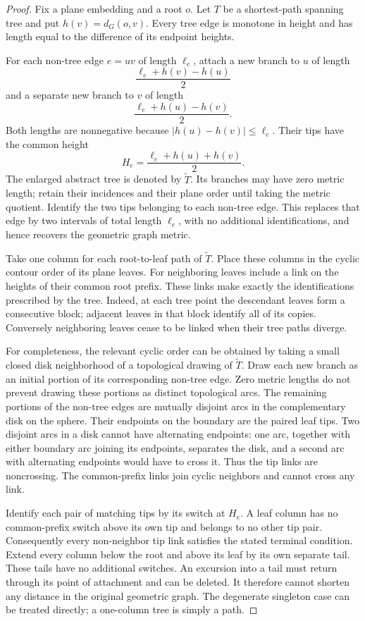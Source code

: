 \begin{proof}
Fix a plane embedding and a root $o$.  Let $T$ be a shortest-path spanning
tree and put $h(v)=d_G(o,v)$.  Every tree edge is monotone in height and has length
equal to the difference of its endpoint heights.

For each non-tree edge $e=uv$ of length $\ell_e$, attach a new branch to
$u$ of length
\[
 \frac{\ell_e+h(v)-h(u)}2
\]
and a separate new branch to $v$ of length
\[
 \frac{\ell_e+h(u)-h(v)}2.
\]
Both lengths are nonnegative because $|h(u)-h(v)|\le\ell_e$.  Their tips
have the common height
\[
 H_e=\frac{\ell_e+h(u)+h(v)}2.
\]
The enlarged abstract tree is denoted by $\widetilde T$.  Its branches may
have zero metric length; retain their incidences and their plane order
until taking the metric quotient.  Identify the two tips belonging to each
non-tree edge.  This replaces that edge by two intervals of total length
$\ell_e$, with no additional identifications, and hence recovers the
geometric graph metric.

Take one column for each root-to-leaf path of $\widetilde T$.  Place these
columns in the cyclic contour order of its plane leaves.  For neighboring
leaves include a link on the heights of their common root prefix.  These
links make exactly the identifications prescribed by the tree.  Indeed,
at each tree point the descendant leaves form a consecutive block; adjacent
leaves in that block identify all of its copies.  Conversely neighboring
leaves cease to be linked when their tree paths diverge.

For completeness, the relevant cyclic order can be obtained by taking a
small closed disk neighborhood of a topological drawing of
$\widetilde T$.  Draw each new branch as an initial portion of its
corresponding non-tree edge.  Zero metric lengths do not prevent drawing
these portions as distinct topological arcs.  The remaining portions of
the non-tree edges are mutually disjoint arcs in the complementary disk
on the sphere.  Their endpoints on the boundary are the paired leaf tips.
Two disjoint arcs in a disk cannot have alternating endpoints: one arc,
together with either boundary arc joining its endpoints, separates the
disk, and a second arc with alternating endpoints would have to cross it.
Thus the tip links are noncrossing.  The common-prefix links join cyclic
neighbors and cannot cross any link.

Identify each pair of matching tips by its switch at $H_e$.  A leaf column
has no common-prefix switch above its own tip and belongs to no other tip
pair.  Consequently every non-neighbor tip link satisfies the stated
terminal condition.  Extend every column below the root and above its
leaf by its own separate tail.  These tails have no additional switches.
An excursion into a tail must return through its point of attachment and
can be deleted.  It therefore cannot shorten any distance in the original
geometric graph.  The degenerate singleton case can be treated directly;
a one-column tree is simply a path.
\end{proof}

